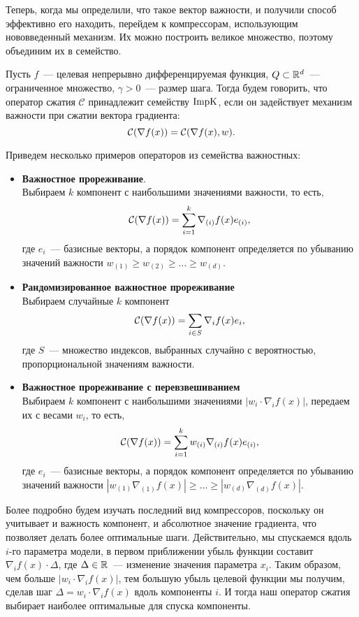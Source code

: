     Теперь, когда мы определили, что такое вектор важности, и получили способ эффективно его находить, перейдем к компрессорам, использующим нововведенный механизм. Их можно построить великое множество, поэтому объединим их в семейство.
    \begin{definition}
        Пусть $f$~--- целевая непрерывно дифференцируемая функция, $Q \subset \mathbb{R}^d$~--- ограниченное множество, $\gamma > 0$~--- размер шага. Тогда будем говорить, что оператор сжатия $\mathcal{C}$ принадлежит семейству $\operatorname{ImpK}$, если он задействует механизм важности при сжатии вектора градиента:
        \begin{equation}
            {\cal C}(\nabla f(x)) = {\cal C}(\nabla f(x), w).
        \end{equation}
    \end{definition}
    Приведем несколько примеров операторов из семейства важностных:
    \begin{itemize}
        \item \textbf{Важностное прореживание}.\\
        Выбираем $k$ компонент с наибольшими значениями важности, то есть,
        \begin{equation}
            {\cal C}(\nabla f(x)) = \sum_{i=1}^k \nabla_{(i)} f(x) e_{(i)},
        \end{equation}
        где $e_i$~--- базисные векторы, а порядок компонент определяется по убыванию значений важности $w_{(1)} \geq w_{(2)} \geq \dots \geq w_{(d)}$.
        \item \textbf{Рандомизированное важностное прореживание}\\
        Выбираем случайные $k$ компонент 
        \begin{equation}
            {\cal C}(\nabla f(x)) = \sum_{i \in S} \nabla_i f(x) e_i,
        \end{equation}
        где $S$~--- множество индексов, выбранных случайно с вероятностью, пропорциональной значениям важности.
        \item \textbf{Важностное прореживание с перевзвешиванием}\\
        Выбираем $k$ компонент с наибольшими значениями $|w_i \cdot \nabla_i f(x)|$, передаем их с весами $w_i$, то есть,
        \begin{equation}
            {\cal C}(\nabla f(x)) = \sum_{i=1}^k w_{(i)} \nabla_{(i)} f(x) e_{(i)},
        \end{equation}
        где $e_i$~--- базисные векторы, а порядок компонент определяется по убыванию значений важности $|w_{(1)} \nabla_{(1)} f(x)| \geq \dots \geq |w_{(d)} \nabla_{(d)} f(x)|$.
    \end{itemize}
    Более подробно будем изучать последний вид компрессоров, поскольку он учитывает и важность компонент, и абсолютное значение градиента, что позволяет делать более оптимальные шаги. Действительно, мы спускаемся вдоль $i$-го параметра модели, в первом приближении убыль функции составит $\nabla_i f(x) \cdot \Delta$, где $\Delta \in \mathbb{R}$~--- изменение значения параметра $x_i$. Таким образом, чем больше $|w_i \cdot \nabla_i f(x)|$, тем большую убыль целевой функции мы получим, сделав шаг $\Delta = w_i \cdot \nabla_i f(x)$ вдоль компоненты $i$. И тогда наш оператор сжатия выбирает наиболее оптимальные для спуска компоненты.

